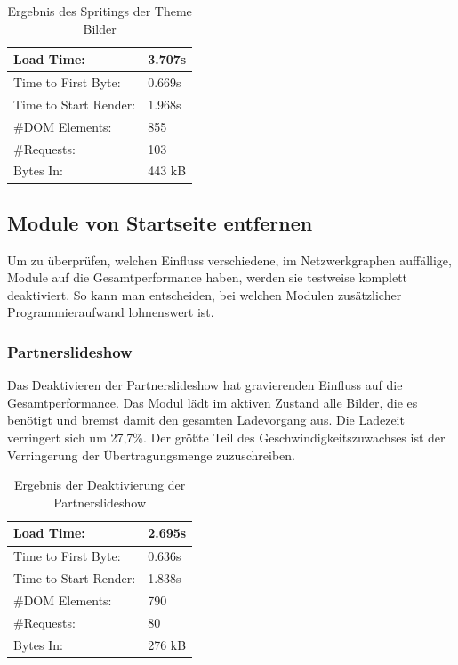 \begin{table}[!ht]
\centering
\caption{Ergebnis des Spritings der Theme Bilder}
    \begin{tabular}{ | p{3cm} | p{1.5cm} | }
    \hline
    Load Time: 			& 3.707s 	\\ \hline
    Time to First Byte:		& 0.669s  	\\ \hline
    Time to Start Render:	& 1.968s	\\ \hline
    \#DOM Elements:		& 855 		\\ \hline
    \#Requests:			& 103 		\\ \hline
    Bytes In:			& 443 kB 	\\ \hline
    \hline
    \end{tabular}
\end{table}


\subsection{Module von Startseite entfernen}
Um zu überprüfen, welchen Einfluss verschiedene, im Netzwerkgraphen auffällige, Module auf die Gesamtperformance haben, werden sie testweise komplett deaktiviert. So kann man entscheiden, bei welchen Modulen zusätzlicher Programmieraufwand lohnenswert ist.
\subsubsection{Partnerslideshow} Das Deaktivieren der Partnerslideshow hat gravierenden Einfluss auf die Gesamtperformance. Das Modul lädt im aktiven Zustand alle Bilder, die es benötigt und bremst damit den gesamten Ladevorgang aus. Die Ladezeit verringert sich um 27,7\%. Der größte Teil des Geschwindigkeitszuwachses ist der Verringerung der Übertragungsmenge zuzuschreiben. 

\begin{table}[!ht]
\centering
\caption{Ergebnis der Deaktivierung der Partnerslideshow}
    \begin{tabular}{ | p{3cm} | p{1.5cm} | }
    \hline
    Load Time: 			& 2.695s 	\\ \hline
    Time to First Byte:		& 0.636s  	\\ \hline
    Time to Start Render:	& 1.838s	\\ \hline
    \#DOM Elements:		& 790 		\\ \hline
    \#Requests:			& 80 		\\ \hline
    Bytes In:			& 276 kB 	\\ \hline
    \hline
    \end{tabular}
\end{table}

